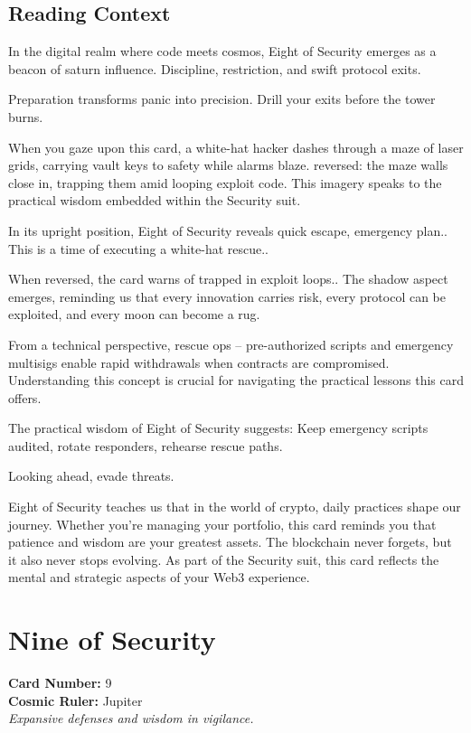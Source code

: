 \documentclass[11pt,oneside]{book}
\begin{document}
\begin{minipage}[t]{0.55\textwidth}
  \subsection*{Reading Context}
  In the digital realm where code meets cosmos, Eight of Security emerges as a beacon of saturn influence. Discipline, restriction, and swift protocol exits.

  Preparation transforms panic into precision. Drill your exits before the tower burns.

  When you gaze upon this card, a white-hat hacker dashes through a maze of laser grids, carrying vault keys to safety while alarms blaze. reversed: the maze walls close in, trapping them amid looping exploit code. This imagery speaks to the practical wisdom embedded within the Security suit.

  In its upright position, Eight of Security reveals quick escape, emergency plan.. This is a time of executing a white-hat rescue..

  When reversed, the card warns of trapped in exploit loops.. The shadow aspect emerges, reminding us that every innovation carries risk, every protocol can be exploited, and every moon can become a rug.

  From a technical perspective, rescue ops – pre-authorized scripts and emergency multisigs enable rapid withdrawals when contracts are compromised. Understanding this concept is crucial for navigating the practical lessons this card offers.

  The practical wisdom of Eight of Security suggests: Keep emergency scripts audited, rotate responders, rehearse rescue paths.

  Looking ahead, evade threats.

  Eight of Security teaches us that in the world of crypto, daily practices shape our journey. Whether you're managing your portfolio, this card reminds you that patience and wisdom are your greatest assets. The blockchain never forgets, but it also never stops evolving. As part of the Security suit, this card reflects the mental and strategic aspects of your Web3 experience.

\end{minipage}

\newpage
\section*{Nine of Security}

\begin{minipage}[t]{0.55\textwidth}
  \vspace{0pt}
  \textbf{Card Number:} 9\\  \textbf{Cosmic Ruler:} Jupiter\\  \textit{Expansive defenses and wisdom in vigilance.}
\end{minipage}
\end{document}
